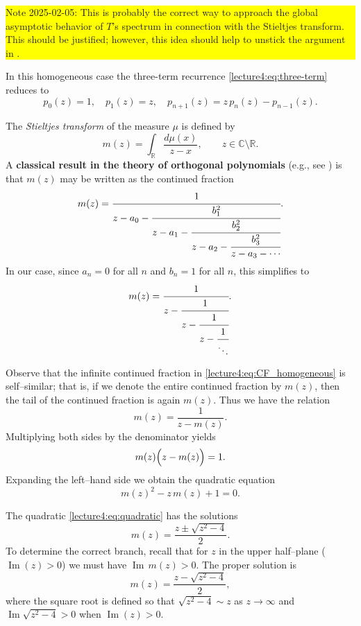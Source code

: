 \documentclass[letterpaper,11pt,oneside,reqno]{book}
\numberwithin{equation}{chapter}  %
\theoremstyle{definition}
\begin{document}
\colorbox{yellow}{\parbox{.7\textwidth}{Note 2025-02-05:
This is probably the correct way to approach the global asymptotic behavior of
$T$'s spectrum in connection with the Stieltjes transform.
This should be justified; however, this idea should help to unstick
the argument in .}}

In this homogeneous case the three-term recurrence \eqref{lecture4:eq:three-term} reduces to
\[
p_0(z)=1,\quad p_1(z)=z,\quad p_{n+1}(z)=z\,p_n(z)-p_{n-1}(z).
\]

\medskip
The \emph{Stieltjes transform} of the measure \(\mu\) is defined by
\[
m(z)=\int_{\mathbb{R}}\frac{d\mu(x)}{z-x},\qquad z\in\mathbb{C}\setminus\mathbb{R}.
\]
A \textbf{classical result in the theory of orthogonal polynomials}
(e.g., see \cite{sokal2020euler})
is that \(m(z)\) may be written as the continued fraction
\begin{equation}\label{lecture4:eq:CF}
m(z)=\cfrac{1}{z-a_0-\cfrac{b_1^2}{z-a_1-\cfrac{b_2^2}{z-a_2-\cfrac{b_3^2}{z-a_3-\cdots}}}}.
\end{equation}
In our case, since \(a_n=0\) for all \(n\) and \(b_n=1\) for all \(n\), this simplifies to
\begin{equation}\label{lecture4:eq:CF_homogeneous}
m(z)=\cfrac{1}{z-\cfrac{1}{z-\cfrac{1}{z-\cfrac{1}{\ddots}}}}.
\end{equation}


Observe that the infinite continued fraction in \eqref{lecture4:eq:CF_homogeneous} is self--similar; that is, if we denote the entire continued fraction by \(m(z)\), then the tail of the continued fraction is again \(m(z)\). Thus we have the relation
\[
m(z)=\frac{1}{z-m(z)}.
\]
Multiplying both sides by the denominator yields
\[
m(z)\Bigl(z-m(z)\Bigr)=1.
\]
Expanding the left--hand side we obtain the quadratic equation
\begin{equation}\label{lecture4:eq:quadratic}
m(z)^2-z\,m(z)+1=0.
\end{equation}


The quadratic \eqref{lecture4:eq:quadratic} has the solutions
\[
m(z)=\frac{z\pm\sqrt{z^2-4}}{2}.
\]
To determine the correct branch, recall that for \(z\) in the upper half--plane (\(\operatorname{Im}(z)>0\)) we must have \(\operatorname{Im}\,m(z)>0\). The proper solution is
\begin{equation}\label{lecture4:eq:m_solution}
m(z)=\frac{z-\sqrt{z^2-4}}{2},
\end{equation}
where the square root is defined so that \(\sqrt{z^2-4}\sim z\) as \(z\to\infty\) and \(\operatorname{Im}\sqrt{z^2-4}>0\) when \(\operatorname{Im}(z)>0\).
\end{document}
